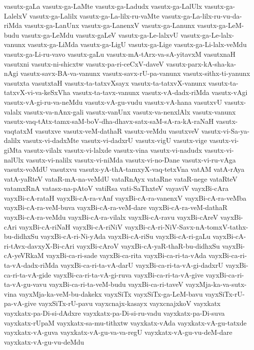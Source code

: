 {vasutx-gaLa
vasutx-ga-LaMte
vasutx-ga-Ladudx
vasutx-ga-LalUlx
vasutx-ga-LalelxV
vasutx-ga-Lalilx
vasutx-ga-La-lilx-ru-vaMte
vasutx-ga-La-lilx-ru-vu-da-riMda
vasutx-ga-LanUnx
vasutx-ga-LanenxV
vasutx-ga-Lanunx
vasutx-ga-LeM-budu
vasutx-ga-LeMdu
vasutx-gaLeV
vasutx-ga-Le-lalxvU
vasutx-ga-Le-lalx-vanunx
vasutx-ga-LiMda
vasutx-ga-LigU
vasutx-ga-Lige
vasutx-ga-Li-lalx-veMdu
vasutx-ga-Li-ru-vavo
vasutx-gaLu
vasutx-mA-tArx-va-sA-yitavxM
vasutxnaH
vasutxni
vasutx-ni-shicxtw
vasutx-pa-ri-ceCxV-daveV
vasutx-parx-kA-sha-ka-nAgi
vasutx-savx-BA-va-vanunx
vasutx-savx-rU-pa-vanunx
vasutx-sithx-ti-yanunx
vasutxta
vasutxtaH
vasutx-ta-tatxvXsayx
vasutx-ta-tatxvX-vanunx
vasutx-ta-tatxvX-vi-va-keSxVha
vasutx-ta-tavx-vanunx
vasutx-vA-dadx-riMda
vasutx-vAgi
vasutx-vA-gi-ru-va-neMdu
vasutx-vA-gu-vudu
vasutx-vA-hana
vasutxvU
vasutx-valalx
vasutx-va-nAnx-gali
vasutx-vanUnx
vasutx-va-nenxlAlx
vasutx-vanunx
vasutx-vaq-tAtx-tamx-saM-boV-dha-dhavx-satx-saM-sA-ra-kA-raNaH
vasutx-vaqtatxM
vasutxve
vasutx-veM-dathaR
vasutx-veMdu
vasutxveV
vasutx-vi-Sa-ya-dalilx
vasutx-vi-dadxMte
vasutx-vi-dadxrU
vasutx-vigU
vasutx-vige
vasutx-vi-giMta
vasutx-vilalx
vasutx-vi-lalxde
vasutx-vina
vasutx-vi-nadudx
vasutx-vi-nalUlx
vasutx-vi-nalilx
vasutx-vi-niMda
vasutx-vi-no-Dane
vasutx-vi-ru-vAga
vasutx-voMdU
vasutxvu
vasutx-yA-thA-tamxyX-vaq-tetxVna
vatAM
vatA-rAya
vatA-yaRteV
vataR-mA-na-veMdU
vataRnAyx
vataRne
vataR-nege
vataRteV
vatamxRnA
vatasx-na-pAtoV
vatiRsa
vati-SaThxteV
vayaviV
vayxBi-cAra
vayxBi-cA-rataH
vayxBi-cA-ra-vAnf
vayxBi-cA-ra-vanenxV
vayxBi-cA-ra-veMba
vayxBi-cA-ra-veM-buva
vayxBi-cA-ra-veM-dare
vayxBi-cA-ra-veM-dathaR
vayxBi-cA-ra-veMdu
vayxBi-cA-ra-vilalx
vayxBi-cA-ravu
vayxBi-cAreV
vayxBi-cAri
vayxBi-cA-riNaH
vayxBi-cA-riNiV
vayxBi-cA-ri-NiV-Savx-nA-tomxV-tathx-bu-didhxSu
vayxBi-cA-ri-Ni-yAda
vayxBi-cA-riSu
vayxBi-cA-ri-gaLu
vayxBi-cA-ri-tAvx-davxyX-Bi-cAri
vayxBi-cAroV
vayxBi-cA-yaR-thaR-bu-didhxSu
vayxBi-cA-yeVRkaM
vayxBi-ca-ri-sade
vayxBi-ca-rita
vayxBi-ca-ri-ta-vAda
vayxBi-ca-ri-ta-vA-dadx-riMda
vayxBi-ca-ri-ta-vA-darU
vayxBi-ca-ri-ta-vA-gi-dadxrU
vayxBi-ca-ri-ta-vA-gide
vayxBi-ca-ri-ta-vA-gi-ruva
vayxBi-ca-ri-ta-vA-give
vayxBi-ca-ri-ta-vA-gu-vavu
vayxBi-ca-ri-ta-veM-budu
vayxBi-ca-ri-taveV
vayxMja-ka-va-sutx-vina
vayxMja-ka-veM-bu-dakekx
vayxSiTx
vayxSiTx-ga-LeM-bavu
vayxSiTx-rU-pa-vA-give
vayxSiTx-rU-pavu
vayxcnajx-kasayx
vayxcnajxkoV
vayxkatx
vayxkatx-pa-Di-si-dAdxre
vayxkatx-pa-Di-si-ru-vadu
vayxkatx-pa-Di-suva
vayxkatx-rUpaM
vayxkatx-sa-mu-tithxtw
vayxkatx-vAda
vayxkatx-vA-gu-tatxde
vayxkatx-vA-guva
vayxkatx-vA-gu-va-va-regU
vayxkatx-vA-gu-vu-deM-dare
vayxkatx-vA-gu-vu-deMdu
}
